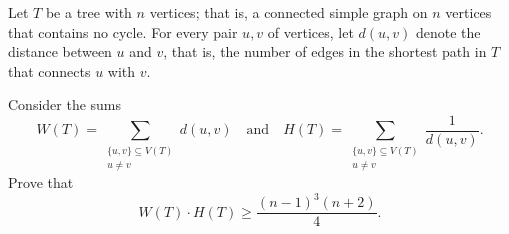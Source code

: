 Let \(T\) be a tree with \(n\) vertices; that is, a connected simple graph on \(n\) vertices that contains no cycle. For every pair \(u, v\) of vertices, let \(d(u,v)\) denote the distance between \(u\) and \(v\), that is, the number of edges in the shortest path in \(T\) that connects \(u\) with \(v\).

Consider the sums
\[
W(T) = \sum_{\substack{\{u,v\} \subseteq V(T) \\ u \ne v}} d(u,v) \quad \text{and} \quad H(T) = \sum_{\substack{\{u,v\} \subseteq V(T) \\ u \ne v}} \frac{1}{d(u,v)}.
\]
Prove that
\[
W(T) \cdot H(T) \ge \frac{(n-1)^3(n+2)}{4}.
\]
